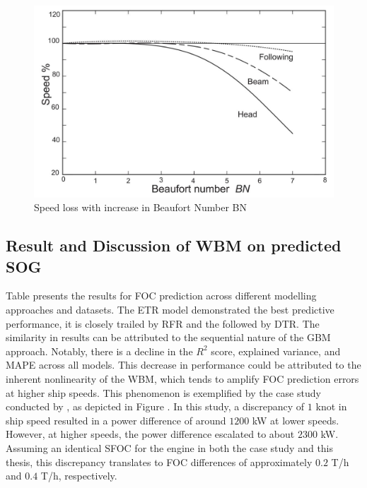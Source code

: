 \begin{figure}[ht]
    \centering
    \includegraphics[width=.7\linewidth]{02_figures/molland17_speedlosscurve.jpg}
    \caption{Speed loss with increase in Beaufort Number BN }
    \label{fig:molland17_speedloss_windwave}
\end{figure}

\subsection{Result and Discussion of WBM on predicted SOG}\label{sec:WBM_result_discussion}

Table  presents the results for FOC prediction across different modelling approaches and datasets. The ETR model demonstrated the best predictive performance, it is closely trailed by RFR and the followed by DTR. The similarity in results can be attributed to the sequential nature of the GBM approach. Notably, there is a decline in the $R^2$ score, explained variance, and MAPE across all models. This decrease in performance could be attributed to the inherent nonlinearity of the WBM, which tends to amplify FOC prediction errors at higher ship speeds. This phenomenon is exemplified by the case study conducted by , as depicted in Figure . In this study, a discrepancy of $1$ knot in ship speed resulted in a power difference of around $1200$ kW at lower speeds. However, at higher speeds, the power difference escalated to about $2300$ kW. Assuming an identical SFOC for the engine in both the  case study and this thesis, this discrepancy translates to FOC differences of approximately $0.2$ T/h and $0.4$ T/h, respectively.

